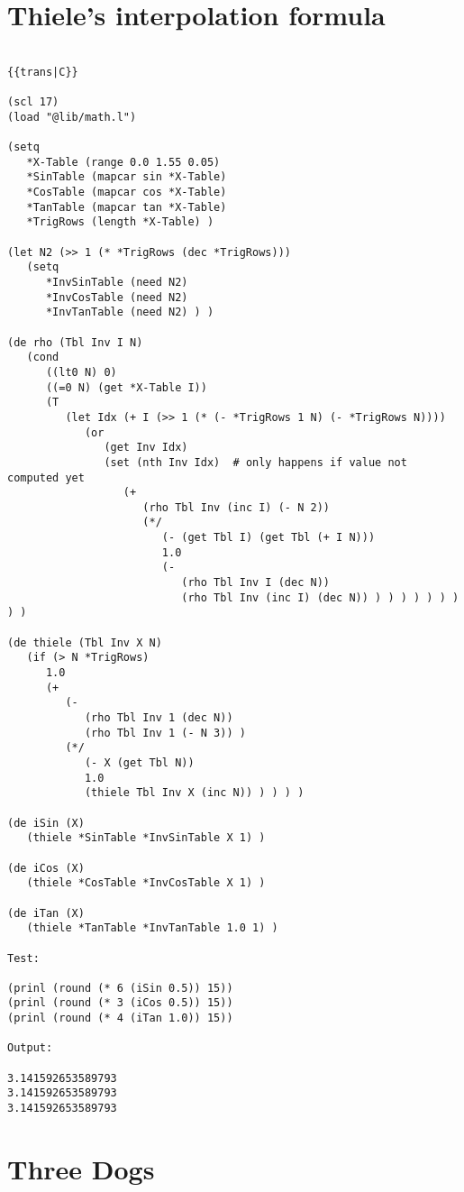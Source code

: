 \section*{Thiele's interpolation formula}

\begin{verbatim}

{{trans|C}}

(scl 17)
(load "@lib/math.l")

(setq
   *X-Table (range 0.0 1.55 0.05)
   *SinTable (mapcar sin *X-Table)
   *CosTable (mapcar cos *X-Table)
   *TanTable (mapcar tan *X-Table)
   *TrigRows (length *X-Table) )

(let N2 (>> 1 (* *TrigRows (dec *TrigRows)))
   (setq
      *InvSinTable (need N2)
      *InvCosTable (need N2)
      *InvTanTable (need N2) ) )

(de rho (Tbl Inv I N)
   (cond
      ((lt0 N) 0)
      ((=0 N) (get *X-Table I))
      (T
         (let Idx (+ I (>> 1 (* (- *TrigRows 1 N) (- *TrigRows N))))
            (or
               (get Inv Idx)
               (set (nth Inv Idx)  # only happens if value not computed yet
                  (+
                     (rho Tbl Inv (inc I) (- N 2))
                     (*/
                        (- (get Tbl I) (get Tbl (+ I N)))
                        1.0
                        (-
                           (rho Tbl Inv I (dec N))
                           (rho Tbl Inv (inc I) (dec N)) ) ) ) ) ) ) ) ) )

(de thiele (Tbl Inv X N)
   (if (> N *TrigRows)
      1.0
      (+
         (-
            (rho Tbl Inv 1 (dec N))
            (rho Tbl Inv 1 (- N 3)) )
         (*/
            (- X (get Tbl N))
            1.0
            (thiele Tbl Inv X (inc N)) ) ) ) )

(de iSin (X)
   (thiele *SinTable *InvSinTable X 1) )

(de iCos (X)
   (thiele *CosTable *InvCosTable X 1) )

(de iTan (X)
   (thiele *TanTable *InvTanTable 1.0 1) )

Test:

(prinl (round (* 6 (iSin 0.5)) 15))
(prinl (round (* 3 (iCos 0.5)) 15))
(prinl (round (* 4 (iTan 1.0)) 15))

Output:

3.141592653589793
3.141592653589793
3.141592653589793

\end{verbatim}

\section*{Three Dogs}

